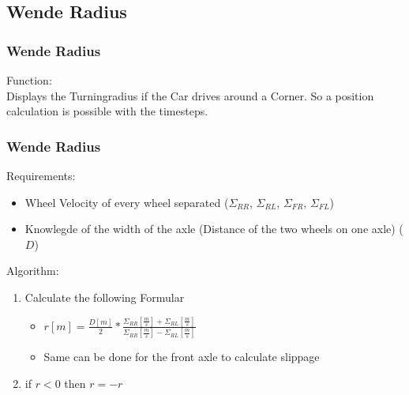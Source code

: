 \documentclass{beamer}
\begin{document}
\subsection{Wende Radius}
\begin{frame}
    \frametitle{Wende Radius}
    Function:\\
    Displays the Turningradius if the Car drives around a Corner. So a position calculation is possible with the timesteps.
\end{frame}
\begin{frame}
    \frametitle{Wende Radius}
    Requirements:
    \begin{itemize}
     \item Wheel Velocity of every wheel separated ($\Sigma_{RR}$, $\Sigma_{RL}$, $\Sigma_{FR}$, $\Sigma_{FL}$)
     \item Knowlegde of the width of the axle (Distance of the two wheels on one axle) ($D$)
    \end{itemize}
    Algorithm:
    \begin{enumerate}
     \item Calculate the following Formular
     \begin{itemize}
        \item $r\left[ m \right]=\frac{D\left[ m \right]}{2}*\frac{\Sigma_{RR}\left[ \frac{m}{s} \right]+\Sigma_{RL}\left[ \frac{m}{s} \right]}{\Sigma_{RR}\left[ \frac{m}{s} \right]-\Sigma_{RL}\left[ \frac{m}{s} \right]}$
        \item Same can be done for the front axle to calculate slippage
     \end{itemize}
     \item if $r<0$ then $r=-r$
    \end{enumerate}
\end{frame}
\end{document}
